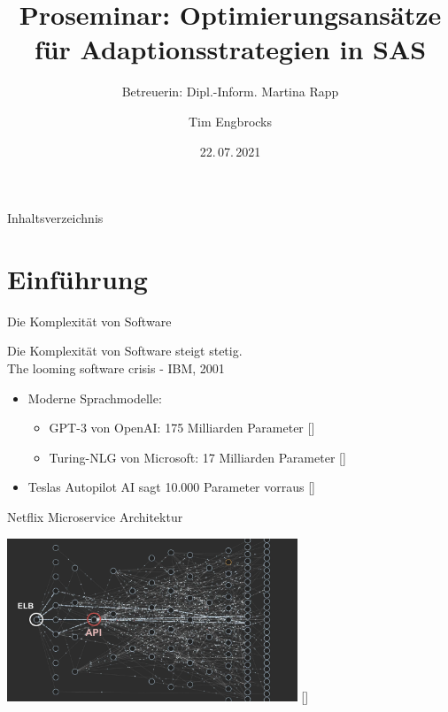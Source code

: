\documentclass[de,16:9]{sdqbeamer}
\title[Proseminar: Optimierungsansätze für Adaptionsstrategien in SAS]{Proseminar: Optimierungsansätze für Adaptionsstrategien in SAS}
\subtitle[Betreuerin: Dipl.-Inform. Martina Rapp]{Betreuerin: Dipl.-Inform. Martina Rapp}
\author[Tim Engbrocks]{Tim Engbrocks}
\date[22.\,07.\,2021]{22.\,07.\,2021}
\begin{document}
\KITtitleframe

\begin{frame}{Inhaltsverzeichnis}
\tableofcontents
\end{frame}

\section{Einführung}

\begin{frame}{Die Komplexität von Software}
	\begin{center}
		Die Komplexität von Software steigt stetig. \\
		\glqq The looming software crisis \grqq - IBM, 2001
	\end{center}
	\medskip
	\begin{itemize}
		\item Moderne Sprachmodelle: 
		\begin{itemize}
			\item GPT-3 von OpenAI: 175 Milliarden Parameter [\cite{GPT3}]
			\item Turing-NLG von Microsoft: 17 Milliarden Parameter [\cite{TuringNLG}]
		\end{itemize}
		\item Teslas Autopilot AI sagt 10.000 Parameter vorraus [\cite{TeslaAutopilot}]
	\end{itemize}
\end{frame}

\begin{frame}{Netflix Microservice Architektur}
	\begin{center}
		\includegraphics[width=0.65\textwidth]{sources/Mastering Chaos.pdf}
		[\cite{JoshQCon}]
	\end{center}
\end{frame}
\end{document}
